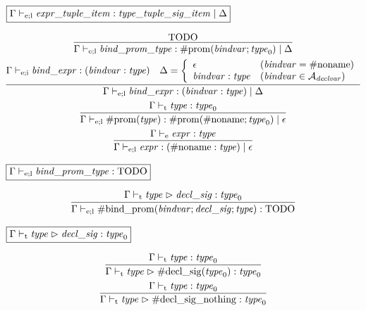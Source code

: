 $\fbox{$\Gamma \vdash_{\mathrm{e}; \mathrm{l}} \mathit{expr\_tuple\_item}: \mathit{type\_tuple\_sig\_item} \mid \Delta$}$

\begin{gather*}
    \infer{\Gamma \vdash_{\mathrm{e}; \mathrm{l}} \mathit{bind\_prom\_type}: \mathrm{\#prom}(\mathit{bindvar}; \mathit{type}_0) \mid \Delta}{
        \text{TODO}
    }
    \\
    \infer{\Gamma \vdash_{\mathrm{e}; \mathrm{l}} \mathit{bind\_expr}: (\mathit{bindvar}: \mathit{type}) \mid \Delta}{
        \Gamma \vdash_{\mathrm{e}; \mathrm{i}} \mathit{bind\_expr}: (\mathit{bindvar}: \mathit{type})
        &
        \Delta = \left\{\begin{array}{ll}
            \epsilon &(\mathit{bindvar} = \mathrm{\#noname}) \\
            \mathit{bindvar}: \mathit{type} &(\mathit{bindvar} \in \mathcal{A}_\mathit{declvar})
        \end{array}\right.
    }
    \\
    \infer{\Gamma \vdash_{\mathrm{e}; \mathrm{l}} \mathrm{\#prom}(\mathit{type}): \mathrm{\#prom}(\mathrm{\#noname}; \mathit{type}_0) \mid \epsilon}{
        \Gamma \vdash_\mathrm{t} \mathit{type}: \mathit{type}_0
    }
    \\
    \infer{\Gamma \vdash_{\mathrm{e}; \mathrm{l}} \mathit{expr}: (\mathrm{\#noname}: \mathit{type}) \mid \epsilon}{
        \Gamma \vdash_\mathrm{e} \mathit{expr}: \mathit{type}
    }
\end{gather*}

$\fbox{$\Gamma \vdash_{\mathrm{e}; \mathrm{l}} \mathit{bind\_prom\_type}: \text{TODO}$}$

\begin{gather*}
    \infer{\Gamma \vdash_{\mathrm{e}; \mathrm{l}} \mathrm{\#bind\_prom}(\mathit{bindvar}; \mathit{decl\_sig}; \mathit{type}): \text{TODO}}{
        \Gamma \vdash_\mathrm{t} \mathit{type} \vartriangleright \mathit{decl\_sig}: \mathit{type}_0
    }
\end{gather*}

$\fbox{$\Gamma \vdash_\mathrm{t} \mathit{type} \vartriangleright \mathit{decl\_sig}: \mathit{type}_0$}$

\begin{gather*}
    \infer{\Gamma \vdash_\mathrm{t} \mathit{type} \vartriangleright \mathrm{\#decl\_sig}(\mathit{type}_0): \mathit{type}_0}{
        \Gamma \vdash_\mathrm{t} \mathit{type}: \mathit{type}_0
    }
    \\
    \infer{\Gamma \vdash_\mathrm{t} \mathit{type} \vartriangleright \mathrm{\#decl\_sig\_nothing}: \mathit{type}_0}{
        \Gamma \vdash_\mathrm{t} \mathit{type}: \mathit{type}_0
    }
\end{gather*}

